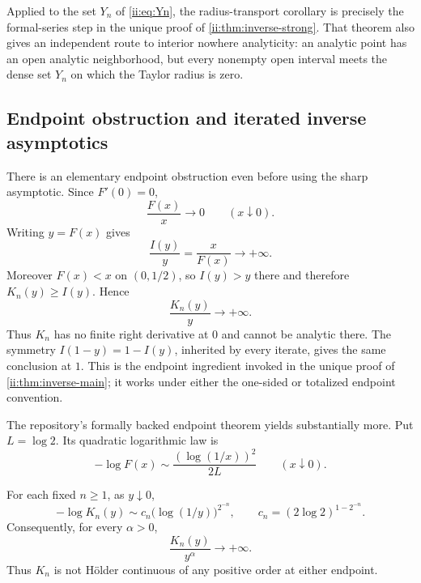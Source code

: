 Applied to the set $Y_n$ of \eqref{ii:eq:Yn}, the radius-transport corollary
is precisely the formal-series step in the unique proof of
\cref{ii:thm:inverse-strong}.  That theorem also gives an independent route
to interior nowhere analyticity: an analytic point has
an open analytic neighborhood, but every nonempty open interval meets the dense set
$Y_n$ on which the Taylor radius is zero.

\subsection{Endpoint obstruction and iterated inverse asymptotics}
\label{ii:sec:endpoint-inverse}

There is an elementary endpoint obstruction even before using the sharp asymptotic.
Since $F'(0)=0$,
\begin{equation}
 \frac{F(x)}{x}\longrightarrow0\qquad(x\downarrow0).
 \label{ii:eq:F-over-x-zero}
\end{equation}
Writing $y=F(x)$ gives
\begin{equation}
 \frac{I(y)}{y}=\frac{x}{F(x)}\longrightarrow+\infty.
 \label{ii:eq:I-over-y-infinite}
\end{equation}
Moreover $F(x)<x$ on $(0,1/2)$, so $I(y)>y$ there and therefore
$K_n(y)\geq I(y)$.  Hence
\begin{equation}
 \frac{K_n(y)}{y}\longrightarrow+\infty.
 \label{ii:eq:Kn-no-derivative}
\end{equation}
Thus $K_n$ has no finite right derivative at $0$ and cannot be analytic there.
The symmetry $I(1-y)=1-I(y)$, inherited by every iterate, gives the same conclusion at
$1$.  This is the endpoint ingredient invoked in the unique proof of
\cref{ii:thm:inverse-main}; it works under either the one-sided or totalized
endpoint convention.

The repository's formally backed endpoint theorem yields substantially more.  Put
$L=\log2$.  Its quadratic logarithmic law is
\begin{equation}
 -\log F(x)\sim\frac{(\log(1/x))^2}{2L}
 \qquad(x\downarrow0).
 \label{ii:eq:quadratic-endpoint-law}
\end{equation}

\begin{theorem}
\label{ii:thm:iterated-endpoint}
For each fixed $n\geq1$, as $y\downarrow0$,
\begin{equation}
 -\log K_n(y)
 \sim c_n\bigl(\log(1/y)\bigr)^{2^{-n}},
 \qquad
 c_n=(2\log2)^{1-2^{-n}}.
 \label{ii:eq:iterated-inverse-endpoint}
\end{equation}
Consequently, for every $\alpha>0$,
\begin{equation}
 \frac{K_n(y)}{y^\alpha}\longrightarrow+\infty.
 \label{ii:eq:not-holder}
\end{equation}
Thus $K_n$ is not H\"older continuous of any positive order at either endpoint.
\end{theorem}

